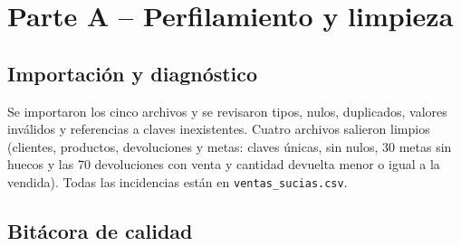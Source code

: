 \documentclass[11pt,letterpaper]{article}
\begin{document}
\section{Parte A -- Perfilamiento y limpieza}

\subsection{Importación y diagnóstico}

Se importaron los cinco archivos y se revisaron tipos, nulos, duplicados, valores inválidos y referencias a
claves inexistentes. Cuatro archivos salieron limpios (clientes, productos, devoluciones y metas: claves únicas,
sin nulos, 30 metas sin huecos y las 70 devoluciones con venta y cantidad devuelta menor o igual a la vendida).
Todas las incidencias están en \texttt{ventas\_sucias.csv}.

\subsection{Bitácora de calidad}
\end{document}
